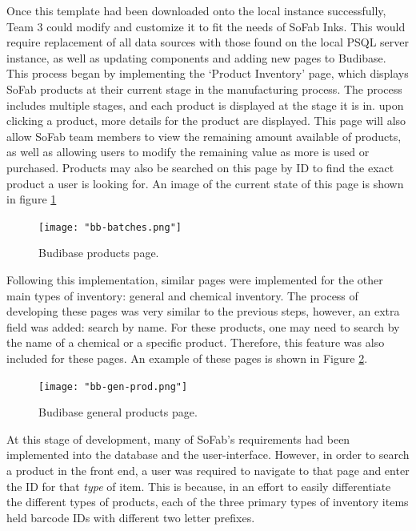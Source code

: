 \documentclass{article}
\begin{document}
Once this template had been downloaded onto the local instance successfully, Team 3 could modify and customize it to fit the needs of
SoFab Inks. This would require replacement of all data sources with those found on the local PSQL server instance, as well as updating
components and adding new pages to Budibase. This process began by implementing the `Product Inventory' page, which displays
SoFab products at their current stage in the manufacturing process. The process includes multiple stages, and each product is 
displayed at the stage it is in. upon clicking a product, more details for the product are displayed. This page will also allow SoFab 
team members to view the remaining amount available of products, as well as allowing users to modify the remaining value as more is 
used or purchased. Products may also be searched on this page by ID to find the exact product a user is looking for.
An image of the current state of this page is shown in figure \ref{fig:bb_batches}
\begin{figure}[h]
\centering
    \centering
    \texttt{[image: "bb-batches.png"]}
    \caption{Budibase products page.}
    \label{fig:bb_batches}
\end{figure}
\FloatBarrier

Following this implementation, similar pages were implemented for the other main types of inventory: general and chemical inventory. 
The process of developing these pages was very similar to the previous steps, however, an extra field was added: search by name. For 
these products, one may need to search by the name of a chemical or a specific product. Therefore, this feature was also included for these
pages. An example of these pages is shown in Figure \ref{fig:bb_gen_prod}.

\begin{figure}[h]
\centering
    \centering
    \texttt{[image: "bb-gen-prod.png"]}
    \caption{Budibase general products page.}
    \label{fig:bb_gen_prod}
\end{figure}
\FloatBarrier

At this stage of development, many of SoFab's requirements had been implemented into the database and the user-interface. However, in 
order to search a product in the front end, a user was required to navigate to that page and enter the ID for that \textit{type} of 
item. This is because, in an effort to easily differentiate the different types of products, each of the three primary types of 
inventory items held barcode IDs with different two letter prefixes. 
\end{document}
